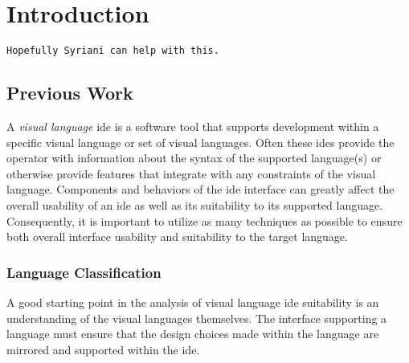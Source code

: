 \section{Introduction}
\label{sec:introduction}

\begin{verbatim}
Hopefully Syriani can help with this.
\end{verbatim}

\subsection{Previous Work}
\label{subsec:previous_work}

A \textit{visual language} \ac{ide} is a software tool that supports
development within a specific visual language or set of visual languages.
Often these \acp{ide} provide the operator with information about the
syntax of the supported language(s) or otherwise provide features that
integrate with any constraints of the visual language. Components and
behaviors of the \ac{ide} interface can greatly affect the overall
usability of an \ac{ide} as well as its suitability to its supported
language. Consequently, it is important to utilize as many techniques as
possible to ensure both overall interface usability and suitability to the
target language.

\subsubsection{Language Classification}
A good starting point in the analysis of visual language \ac{ide}
suitability is an understanding of the visual languages themselves. The
interface supporting a language must ensure that the design choices made
within the language are mirrored and supported within the \ac{ide}.
\cite{hils1992}
